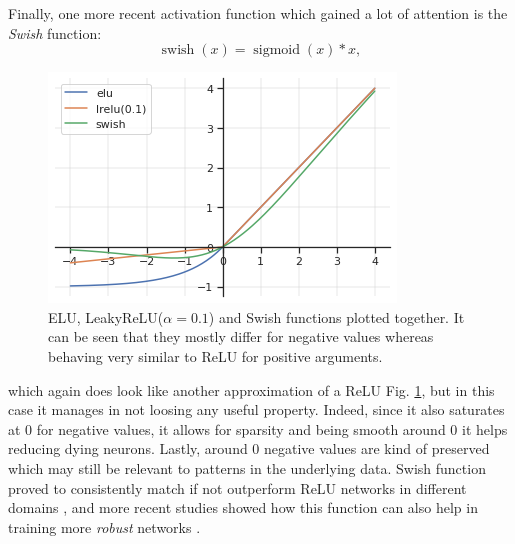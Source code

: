 \documentclass[LaM,binding=0.6cm]{./packages/sapthesis/sapthesis}
\begin{document}
            Finally, one more recent activation function which gained a lot of attention is the \textit{Swish} function:
            \begin{equation}
                \operatorname{swish}(x)= \operatorname{sigmoid}(x) * x,
            \end{equation}
            
            \begin{figure}[hb!]
                \centering
                \includegraphics[scale=0.50]{afunctions}
                \caption{ELU, LeakyReLU($\alpha=0.1$) and Swish functions plotted together. It can be seen that they mostly differ for negative values whereas behaving very similar to ReLU for positive arguments.}
                \label{fig:afuncs}
            \end{figure}
            which again does look like another approximation of a ReLU Fig. \ref{fig:afuncs}, but in this case it manages in not loosing any useful property. Indeed, since
            it also saturates at 0 for negative values, it allows for sparsity and being smooth around 0 it helps reducing dying neurons. Lastly, around 0 negative 
            values are kind of preserved which may still be relevant to patterns in the underlying data.
            Swish function proved to consistently match if not outperform ReLU networks in different domains \cite{swish}, and more recent studies showed how this function
            can also help in training more \textit{robust} networks \cite{smooth_adversarial_training}.
\end{document}
